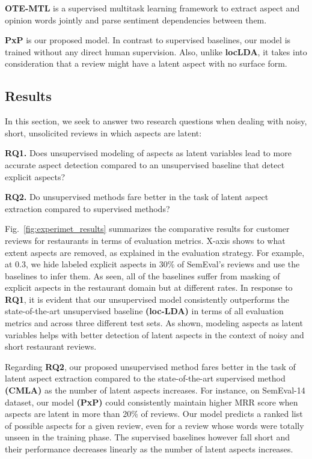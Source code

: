 \documentclass[11pt]{article}
\begin{document}
\noindent\textbf{OTE-MTL} \cite{Zhang_2020} is a supervised multitask learning framework to extract aspect and opinion words jointly and parse sentiment dependencies between them. 

\noindent\textbf{PxP} is our proposed model. In contrast to supervised baselines, our model is trained without any direct human supervision. Also, unlike \textbf{locLDA}, it takes into consideration that a review might have a latent aspect with no surface form. 

\subsection{Results}
In this section, we seek to answer two research questions when dealing with noisy, short, unsolicited reviews in which aspects are latent:

\noindent\textbf{RQ1.} Does unsupervised modeling of aspects as latent variables lead to more accurate aspect detection compared to an unsupervised baseline that detect explicit aspects? 

\noindent\textbf{RQ2.} Do unsupervised methods fare better in the task of latent aspect extraction compared to supervised methods?

Fig.~\ref{fig:experimet_results} summarizes the comparative results for customer reviews for restaurants in terms of evaluation metrics. X-axis shows to what extent aspects are removed, as explained in the evaluation strategy. For example, at 0.3, we hide labeled explicit aspects in 30\% of SemEval's reviews and use the baselines to infer them. As seen, all of the baselines suffer from masking of explicit aspects in the restaurant domain but at different rates. In response to \textbf{RQ1}, it is evident that our unsupervised model consistently outperforms the state-of-the-art unsupervised baseline \textbf{(loc-LDA)} in terms of all evaluation metrics and across three different test sets. As shown, modeling aspects as latent variables helps with better detection of latent aspects in the context of noisy and short restaurant reviews. 

Regarding \textbf{RQ2}, our proposed unsupervised method fares better in the task of latent aspect extraction compared to the state-of-the-art supervised method \textbf{(CMLA)} as the number of latent aspects increases. For instance, on SemEval-14 dataset, our model \textbf{(PxP)} could consistently maintain higher MRR score when aspects are latent in more than 20\% of reviews. Our model predicts a ranked list of possible aspects for a given review, even for a review whose words were totally unseen in the training phase. The supervised baselines however fall short and their performance decreases linearly as the number of latent aspects increases. 
\end{document}
